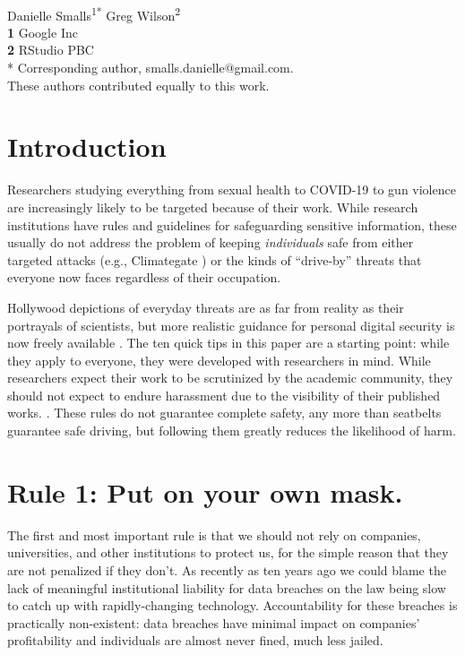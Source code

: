 \documentclass[10pt,letterpaper]{article}
\begin{document}
\vspace*{0.2in}

\begin{flushleft}
{\Large
\textbf{}
}
\newline
\\
{Danielle Smalls}\textsuperscript{1{\ddag}*}
{Greg Wilson}\textsuperscript{2{\ddag}}
\\
\bigskip
\textbf{1} Google Inc\\
\textbf{2} RStudio PBC\\
* Corresponding author, smalls.danielle@gmail.com. \\
\bigskip
{\ddag} These authors contributed equally to this work.
\end{flushleft}

\section*{Introduction}

Researchers studying everything from sexual health to COVID-19 to gun violence
are increasingly likely to be targeted because of their work.  While research
institutions have rules and guidelines for safeguarding sensitive information,
these usually do not address the problem of keeping \emph{individuals} safe from
either targeted attacks (e.g., Climategate \cite{Natu2010}) or the kinds of
``drive-by'' threats that everyone now faces regardless of their occupation.

Hollywood depictions of everyday threats are as far from reality as their
portrayals of scientists, but more realistic guidance for personal digital
security is now freely available \cite{FLD,EFJ2015,EFF}. The ten quick tips in
this paper are a starting point: while they apply to everyone, they were
developed with researchers in mind. While researchers expect their work to be
scrutinized by the academic community, they should not expect to endure
harassment due to the visibility of their published works. . These rules do not
guarantee complete safety, any more than seatbelts guarantee safe driving, but
following them greatly reduces the likelihood of harm.

\section*{Rule 1: Put on your own mask.}

The first and most important rule is that we should not rely on companies,
universities, and other institutions to protect us, for the simple reason that
they are not penalized if they don't. As recently as ten years ago we could
blame the lack of meaningful institutional liability for data breaches on the
law being slow to catch up with rapidly-changing technology. Accountability for
these breaches is practically non-existent: data breaches have minimal impact on
companies' profitability and individuals are almost never fined, much less
jailed.
\end{document}
